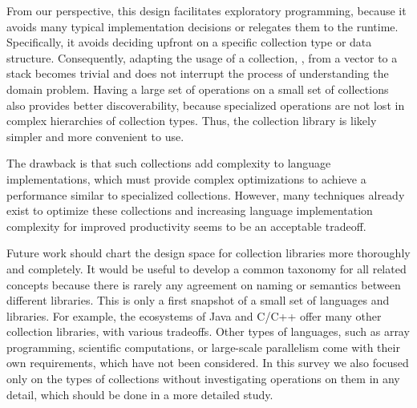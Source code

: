 \documentclass[sigconf, 10pt]{acmart}
\begin{document}
From our perspective, this design facilitates exploratory programming,
because it avoids many typical implementation decisions or relegates them to the runtime.
Specifically, it avoids deciding upfront on a specific collection type
or data structure.
Consequently, adapting the usage of a collection,
\eg, from a vector to a stack becomes trivial
and does not interrupt the process of understanding the domain problem.
Having a large set of operations on a small set of collections also
provides better discoverability,
because specialized operations
are not lost in complex hierarchies of collection types.
Thus, the collection library is likely simpler and more convenient to use.

The drawback is that such collections
add complexity to language implementations,
which must provide complex optimizations
to achieve a performance similar to specialized collections.
However, many techniques already exist to optimize these collections
and increasing language implementation complexity for improved productivity
seems to be an acceptable tradeoff.

%


Future work should chart the design space for collection libraries more 
thoroughly and completely.
It would be useful to develop a common taxonomy for all related concepts
because there is rarely any agreement on naming or semantics between different
libraries.
This is only a first snapshot of a small set of languages and libraries.
For example, the ecosystems of Java and  C/C++
offer many other collection libraries,
with various tradeoffs.
Other types of languages, such as array programming,
scientific computations, or large-scale parallelism come with their own
requirements, which have not been considered.
In this survey we also focused only on the types of collections
without investigating operations on them in any detail,
which should be done in a more detailed study.
\end{document}
